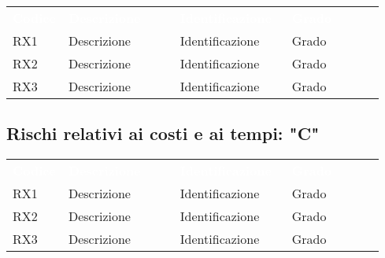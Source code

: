 {\renewcommand{\arraystretch}{1.5}
\begin{tabular}{ >{\centering}p{0.15\linewidth}  >{\centering}p{0.30\linewidth}  >{\centering}p{0.30\linewidth}  >{\centering}p{0.25\linewidth} }
	\rowcolor[RGB]{33, 73, 50}
	\textcolor{white}{\textbf{Codice}} & \textcolor{white}
	{\textbf{Descrizione}} & \textcolor{white}{\textbf{Identificazione}} & \textcolor{white}{\textbf{Grado}}\tabularnewline
	\rowcolor[RGB]{216, 235, 171}
	RX1 & Descrizione & Identificazione & Grado\tabularnewline
	\rowcolor[RGB]{233, 245, 206}
	RX2 & Descrizione & Identificazione & Grado\tabularnewline
	\rowcolor[RGB]{216, 235, 171}
	RX3 & Descrizione & Identificazione & Grado\tabularnewline
	
\end{tabular}	
}

\subsection{Rischi relativi ai costi e ai tempi: "C"}

{\renewcommand{\arraystretch}{1.5}
\begin{tabular}{ >{\centering}p{0.15\linewidth}  >{\centering}p{0.30\linewidth}  >{\centering}p{0.30\linewidth}  >{\centering}p{0.25\linewidth} }
	\rowcolor[RGB]{33, 73, 50}
	\textcolor{white}{\textbf{Codice}} & \textcolor{white}
	{\textbf{Descrizione}} & \textcolor{white}{\textbf{Identificazione}} & \textcolor{white}{\textbf{Grado}}\tabularnewline
	\rowcolor[RGB]{216, 235, 171}
	RX1 & Descrizione & Identificazione & Grado\tabularnewline
	\rowcolor[RGB]{233, 245, 206}
	RX2 & Descrizione & Identificazione & Grado\tabularnewline
	\rowcolor[RGB]{216, 235, 171}
	RX3 & Descrizione & Identificazione & Grado\tabularnewline
	
\end{tabular}	
}

